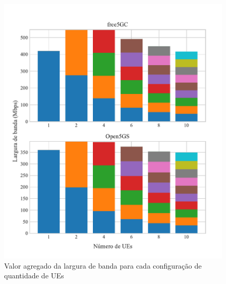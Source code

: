 \begin{figure}[H]
    \centering
    \includegraphics[width=1\textwidth]{TG2/Chapters/DataAnalysis/Figures/EXP2-ALL-4C-4GB.pdf}
    \caption{Valor agregado da largura de banda para cada configuração de quantidade de UEs}
    \label{fig:exp2_all_4-4}
\end{figure}
